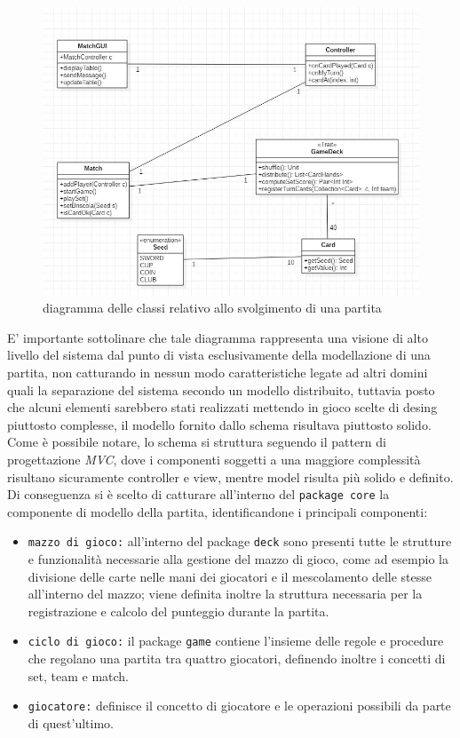 \begin{figure}
  \includegraphics[width=\textwidth,height=\textheight,keepaspectratio]{initialArchitecture}
   \caption{diagramma delle classi relativo allo svolgimento di una partita}
\end{figure}

 E' importante sottolinare che tale diagramma rappresenta una visione di alto livello del sistema dal punto di vista esclusivamente della modellazione di una partita, non catturando in nessun modo caratteristiche legate ad altri domini quali la separazione del sistema secondo un modello distribuito, tuttavia posto che alcuni elementi sarebbero stati realizzati mettendo in gioco scelte di desing piuttosto complesse, il modello fornito dallo schema risultava piuttosto solido.
 Come è possibile notare, lo schema si struttura seguendo il pattern di progettazione \textit{MVC}, dove i componenti soggetti a una maggiore complessità risultano sicuramente controller e view, mentre model risulta più solido e definito.
 Di conseguenza si è scelto di catturare all'interno del \texttt{package core} la componente di modello della partita, identificandone i principali componenti:

\begin{itemize}
  \item{\texttt{mazzo di gioco:\/}} all'interno del package \texttt{deck} sono presenti tutte le strutture e funzionalità necessarie alla gestione del mazzo di gioco, come ad esempio la divisione delle carte nelle mani dei giocatori e il mescolamento delle stesse all'interno del mazzo; viene definita inoltre la struttura necessaria per la registrazione e calcolo del punteggio durante la partita.


  \item{\texttt{ciclo di gioco:\/}} il package \texttt{game} contiene l'insieme delle regole e procedure che regolano una partita tra quattro giocatori, definendo inoltre i concetti di set, team e match.

  \item{\texttt{giocatore:\/}} definisce il concetto di giocatore e le operazioni possibili da parte di quest'ultimo.

\end{itemize}

